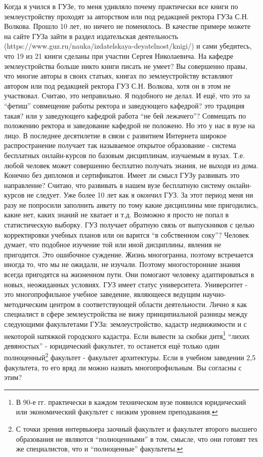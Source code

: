 \begin{drama}
	\maxspeaks Когда я учился в ГУЗе, то меня удивляло почему практически все книги по землеустройству проходят за авторством или под редакцией ректора ГУЗа С.Н. Волкова. Прошло 10 лет, но ничего не поменялось. В качестве примере можете на сайте ГУЗа зайти в раздел издательская деятельность (https://www.guz.ru/nauka/izdatelskaya-deyatelnost/knigi/) и сами убедитесь, что 19 из 21 книги сделаны при участии Сергея Николаевича. На кафедре землеустройства больше никто книги писать не умеет? 
	\michaelspeaks Вы совершенно правы, что многие авторы в своих статьях, книгах по землеустройству вставляют автором или под редакцией ректора ГУЗ С.Н. Волкова, хотя он в этом не участвовал. Считаю, это неправильно. Я подобного не делал. 
	\maxspeaks И ещё, что это за “фетиш” совмещение работы ректора и заведующего кафедрой? это традиция такая? или у заведующего кафедрой работа “не бей лежачего”? 
	\michaelspeaks Совмещать по положению ректора и заведование кафедрой не положено. Но это у нас в вузе на лицо.
	\maxspeaks В последнее десятилетие в связи с развитием Интернета широкое распространение получает так называемое открытое образование - система бесплатных онлайн-курсов по базовым дисциплинам, изучаемым в вузах. Т.е. любой человек может совершенно бесплатно получать знания, не выходя из дома. Конечно без дипломов и сертификатов. Имеет ли смысл ГУЗу развивать это направление?
	\michaelspeaks Считаю, что развивать в нашем вузе бесплатную систему онлайн-курсов не следует.
	\maxspeaks Уже более 10 лет как я окончил ГУЗ. За этот период меня ни разу не попросили заполнить анкету по тому какие дисциплины мне пригодились, какие нет, каких знаний не хватает и т.д. Возможно я просто не попал в статистическую выборку. ГУЗ получает обратную связь от выпускников с целью корректировки учебных планов или он варится “в собственном соку”?
	\michaelspeaks Человек думает, что подобное изучение той или иной дисциплины, явления не пригодится. Это ошибочное суждение. Жизнь многогранна, поэтому встречается иногда то, что мы не ожидали, не изучали. Поэтому многосторонние знания всегда пригодятся на жизненном пути. Они помогают человеку адаптироваться в новых, неожиданных условиях.
	\maxspeaks ГУЗ имеет статус университета. Университет - это многопрофильное учебное заведение, являющееся ведущим научно-методическим центром в соответствующей области деятельности. 
Лично я как специалист в сфере землеустройства не вижу принципиальной разницы между следующими факультетами ГУЗа: землеустройство, кадастр недвижимости и с некоторой натяжкой городского кадастра. Если вывести за скобки дитя\footnote{В 90-е гг. практически в каждом техническом вузе появился юридический или экономический факультет с низким уровнем преподавания.} “лихих девяностых” - юридический факультет, то останется ещё только один полноценный\footnote{С точки зрения интервьюера заочный факультет и факультет второго высшего образования не являются “полноценными” в том, смысле, что они готовят тех же специалистов, что и “полноценные” факультеты.} факультет - факультет архитектуры. Если в учебном заведении 2,5 факультета, то его вряд ли можно назвать многопрофильным. Вы согласны с этим?

\end{drama}
